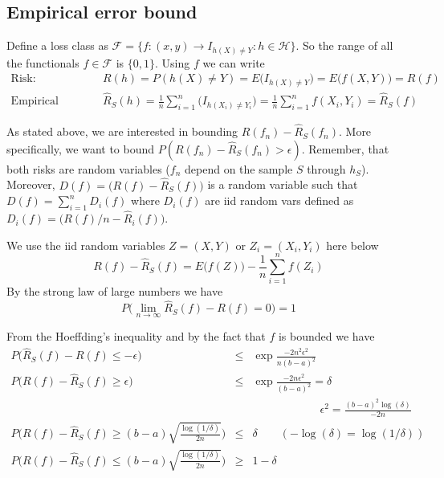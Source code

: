 \subsection{Empirical error bound}
Define a loss class as $\mathcal{F} = \{ f : (x,y) \to I_{h(X) \neq Y} : h \in \mathcal{H} \}$. So the range of all the functionals $f \in \mathcal{F}$ is $\{0,1\}$.
Using $f$ we can write
\begin{eqnarray}
\text{Risk: } & \qquad & R(h) = P(h(X) \neq Y) = E \big( I_{h(X) \neq Y} \big) = E \big( f(X,Y) \big) = R(f) \\
\text{Empirical risk: } & \qquad & \widehat{R}_S(h) = \frac{1}{n} \sum_{i=1}^n \Big( I_{h(X_i) \neq Y_i} \Big) = \frac{1}{n} \sum_{i=1}^n f(X_i,Y_i) = \widehat{R}_S(f)
\end{eqnarray}

As stated above, we are interested in bounding $R(f_n) - \widehat{R}_S(f_n)$.
More specifically, we want to bound $P(R(f_n) - \widehat{R}_S(f_n) > \epsilon )$.
Remember, that both risks are random variables ($f_n$ depend on the sample $S$ through $h_S$).
Moreover, $D(f) = \big( R(f) - \widehat{R}_S(f) \big)$ is a random variable such that $D(f) =  \sum_{i=1}^n D_i(f)$ where $D_i(f)$ are iid random vars defined as $D_i(f) = \big( R(f)/n - \widehat{R}_i(f) \big)$. 

We use the iid random variables $Z = (X,Y)$ or $Z_i = (X_i,Y_i)$ here below
\begin{equation}
R(f) - \widehat{R}_S(f) = E\big( f(Z) \big) -  \frac{1}{n} \sum_{i=1}^n f(Z_i)
\end{equation}
By the strong law of large numbers we have
\begin{equation}
P \Big( \lim_{n \to \infty} \widehat{R}_S(f) - R(f) = 0 \Big) = 1
\end{equation}

From the Hoeffding's inequality and by the fact that $f$ is bounded we have
\begin{eqnarray}
P \Big( \widehat{R}_S(f) - R(f) \leq - \epsilon \Big) & \leq & \exp \frac{-2 n^2 \epsilon^2}{n(b-a)^2} \\
P \Big( R(f) - \widehat{R}_S(f) \geq \epsilon \Big) & \leq & \exp \frac{-2 n \epsilon^2}{(b-a)^2} = \delta \\
& & \qquad \qquad \qquad \epsilon^2 = \frac{(b-a)^2 \log (\delta)}{-2n}  \\
P \Big( R(f) - \widehat{R}_S(f)  \geq (b-a) \sqrt{\frac{\log (1/ \delta)}{2n}} \Big) & \leq & \delta  \qquad (-\log(\delta) = \log(1/\delta))\\
P \Big( R(f) - \widehat{R}_S(f)  \leq (b-a) \sqrt{\frac{\log (1/ \delta)}{2n}} \Big) & \geq & 1 - \delta\\
\end{eqnarray}

